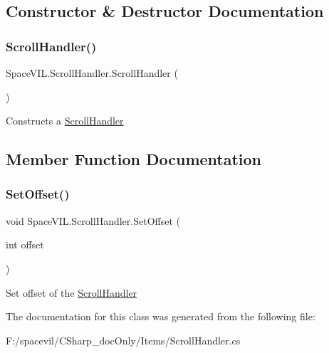\subsection{Constructor \& Destructor Documentation}
\mbox{\label{class_space_v_i_l_1_1_scroll_handler_a95452d5c586be5d21542dd743639cd62}} 
\subsubsection{\texorpdfstring{Scroll\+Handler()}{ScrollHandler()}}
{\footnotesize\ttfamily Space\+V\+I\+L.\+Scroll\+Handler.\+Scroll\+Handler (\begin{DoxyParamCaption}{ }\end{DoxyParamCaption})}



Constructs a \mbox{\hyperlink{class_space_v_i_l_1_1_scroll_handler}{Scroll\+Handler}} 



\subsection{Member Function Documentation}
\mbox{\label{class_space_v_i_l_1_1_scroll_handler_abce983699a4e1e947d6e6b8f91a97080}} 
\subsubsection{\texorpdfstring{Set\+Offset()}{SetOffset()}}
{\footnotesize\ttfamily void Space\+V\+I\+L.\+Scroll\+Handler.\+Set\+Offset (\begin{DoxyParamCaption}\item[{int}]{offset }\end{DoxyParamCaption})}



Set offset of the \mbox{\hyperlink{class_space_v_i_l_1_1_scroll_handler}{Scroll\+Handler}} 



The documentation for this class was generated from the following file\+:\begin{DoxyCompactItemize}
\item 
F\+:/spacevil/\+C\+Sharp\+\_\+doc\+Only/\+Items/Scroll\+Handler.\+cs\end{DoxyCompactItemize}

